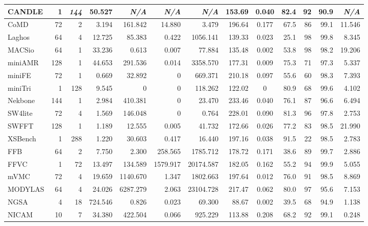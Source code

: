 \begin{table*}[tbp]
\begin{tabular}{|l|r|r|r|r|r|r|r|c|r|r|r|r|}
        CANDLE	    &	1	&	\textit{144}	&	50.527	&	\textit{N/A}	&	\textit{N/A}	&	\textit{N/A}	&	153.69	&	0.040	&	82.4	&	92	&	90.9	&	\textit{N/A}	\\ \hline
        CoMD	    &	72	&	2	&	3.194	&	161.842	&	14.880	&	3.479	&	196.64	&	0.177	&	67.5	&	86	&	99.1	&	11.546	\\ \hline \rC
        Laghos	    &	64	&	4	&	12.725	&	85.383	&	0.422	&	1056.141	&	139.33	&	0.023	&	25.1	&	98	&	99.8	&	8.345	\\ \hline
        MACSio	    &	64	&	1	&	33.236	&	0.613	&	0.007	&	77.884	&	135.48	&	0.002	&	53.8	&	98	&	98.2	&	19.206	\\ \hline \rC
        miniAMR	    &	128	&	1	&	44.653	&	291.536	&	0.014	&	3358.570	&	177.31	&	0.009	&	75.3	&	71	&	97.3	&	5.337	\\ \hline
        miniFE	    &	72	&	1	&	0.669	&	32.892	&	0	&	669.371	&	210.18	&	0.097	&	55.6	&	60	&	98.3	&	7.393	\\ \hline \rC
        miniTri	    &	1	&	128	&	9.545	&	0	&	0	&	118.262	&	122.02	&	0	&	80.9	&	68	&	99.6	&	4.102	\\ \hline
        Nekbone	    &	144	&	1	&	2.984	&	410.381	&	0	&	23.470	&	233.46	&	0.040	&	76.1	&	87	&	96.6	&	6.494	\\ \hline \rC
        SW4lite	    &	72	&	4	&	1.569	&	146.048	&	0	&	0.764	&	228.01	&	0.090	&	81.3	&	96	&	97.8	&	2.753	\\ \hline
        SWFFT	    &	128	&	1	&	1.189	&	12.555	&	0.005	&	41.732	&	172.66	&	0.026	&	77.2	&	83	&	98.5	&	21.990	\\ \hline \rC
        XSBench	    &	1	&	288	&	1.220	&	30.603	&	0.417	&	16.440	&	197.16	&	0.038	&	91.5	&	22	&	98.5	&	2.783	\\ \hline\hline
        FFB	        &	64	&	2	&	7.750	&	2.300	&	258.565	&	1785.712	&	178.72	&	0.171	&	38.6	&	89	&	99.7	&	2.886	\\ \hline \rC
        FFVC	    &	1	&	72	&	13.497	&	134.589	&	1579.917	&	20174.587	&	182.05	&	0.162	&	55.2	&	94	&	99.9	&	5.055	\\ \hline
        mVMC	    &	72	&	4	&	19.659	&	1140.670	&	1.347	&	1802.663	&	197.64	&	0.012	&	76.0	&	91	&	98.5	&	8.869	\\ \hline \rC
        MODYLAS	    &	64	&	4	&	24.026	&	6287.279	&	2.063	&	23104.728	&	217.47	&	0.062	&	80.0	&	97	&	95.6	&	7.153	\\ \hline
        NGSA	    &	4	&	18	&	724.546	&	0.826	&	0.023	&	69.300	&	88.67	&	0.002	&	39.5	&	68	&	94.9	&	1.138	\\ \hline \rC
        NICAM	    &	10	&	7	&	34.380	&	422.504	&	0.066	&	925.229	&	113.88	&	0.208	&	68.2	&	92	&	99.1	&	0.248	\\ \hline

\end{tabular}
\end{table*}
